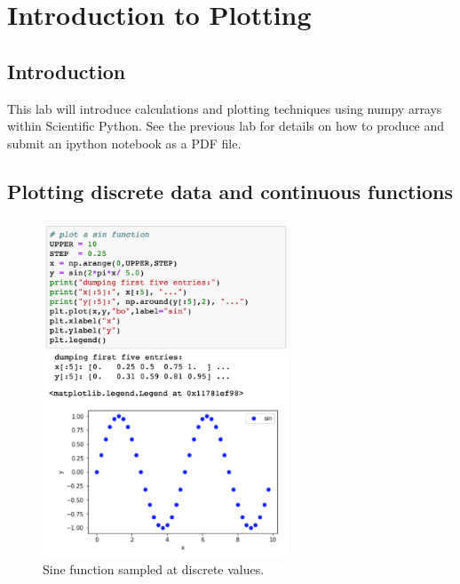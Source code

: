 \chapter{Introduction to Plotting}

\section{Introduction}

This lab will introduce calculations and plotting techniques using
numpy arrays within Scientific Python.  See the previous lab for
details on how to produce and submit an ipython notebook as a PDF
file.

\section{Plotting discrete data and continuous functions}

\begin{figure}[htbp]
\begin{center}
\includegraphics[width=0.65\textwidth]{figs/labs//plotting/plotting.png} 
\caption{Sine function sampled at discrete values.}
\label{fig:plotsin}
\end{center}
\end{figure}


